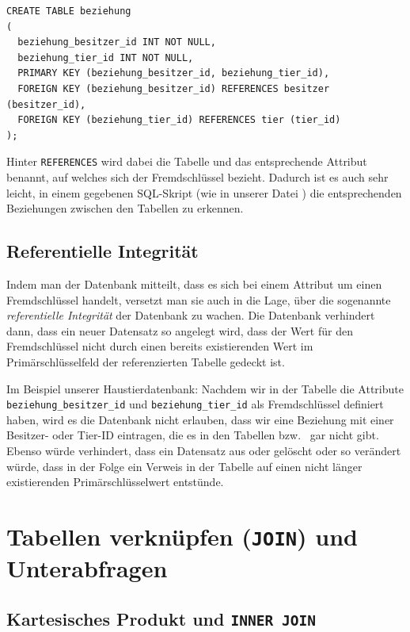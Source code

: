 \begin{lstlisting}
CREATE TABLE beziehung
(
  beziehung_besitzer_id INT NOT NULL,
  beziehung_tier_id INT NOT NULL,
  PRIMARY KEY (beziehung_besitzer_id, beziehung_tier_id),
  FOREIGN KEY (beziehung_besitzer_id) REFERENCES besitzer (besitzer_id),
  FOREIGN KEY (beziehung_tier_id) REFERENCES tier (tier_id)
);
\end{lstlisting}

Hinter \lstinline|REFERENCES| wird dabei die Tabelle und das entsprechende
Attribut benannt, auf welches sich der Fremdschlüssel bezieht. Dadurch ist es
auch sehr leicht, in einem gegebenen SQL-Skript (wie in unserer Datei
) die entsprechenden Beziehungen zwischen den Tabellen zu
erkennen.

\subsection{Referentielle Integrität}

Indem man der Datenbank mitteilt, dass es sich bei einem Attribut um einen
Fremdschlüssel handelt, versetzt man sie auch in die Lage, über die sogenannte
\emph{referentielle Integrität} der Datenbank zu wachen. Die Datenbank
verhindert dann, dass ein neuer Datensatz so angelegt wird, dass der Wert für
den Fremdschlüssel nicht durch einen bereits existierenden Wert im
Primärschlüsselfeld der referenzierten Tabelle gedeckt ist.

Im Beispiel unserer Haustierdatenbank: Nachdem wir in der Tabelle
 die Attribute \linebreak \lstinline|beziehung_besitzer_id| und
\lstinline|beziehung_tier_id| als Fremdschlüssel definiert haben, wird es die
Datenbank nicht erlauben, dass wir eine Beziehung mit einer Besitzer- oder
Tier-ID eintragen, die es in den Tabellen  bzw.\
 gar nicht gibt. Ebenso würde verhindert, dass ein Datensatz
aus \myUserInput{besitzer} oder \myUserInput{tier} gelöscht oder so verändert
würde, dass in der Folge ein Verweis in der Tabelle \myUserInput{beziehung} auf
einen nicht länger existierenden Primärschlüsselwert entstünde.


\section{Tabellen verknüpfen (\texttt{JOIN}) und Unterabfragen}

\subsection{Kartesisches Produkt und \texttt{INNER JOIN}}

